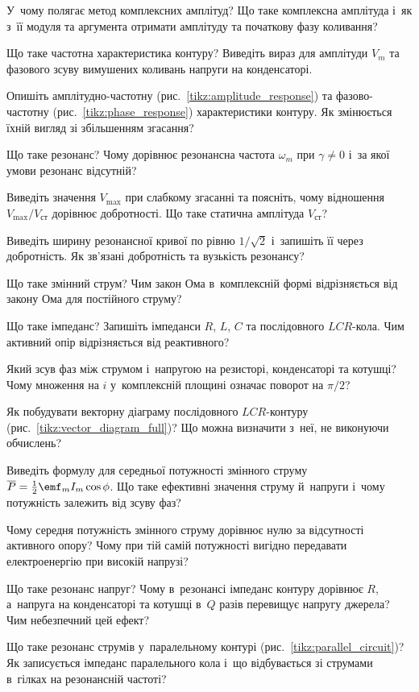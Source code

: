 \begin{Questions}
\begin{quizlist}
	\item У~чому полягає метод комплексних амплітуд? Що таке комплексна амплітуда і~як з~її модуля та аргумента отримати амплітуду та початкову фазу коливання?
	\item Що таке частотна характеристика контуру? Виведіть вираз для амплітуди $V_m$ та фазового зсуву вимушених коливань напруги на конденсаторі.
	\item Опишіть амплітудно-частотну (рис.~\ref{tikz:amplitude_response}) та фазово-частотну (рис.~\ref{tikz:phase_response}) характеристики контуру. Як змінюється їхній вигляд зі збільшенням згасання?
	\item Що таке резонанс? Чому дорівнює резонансна частота $\omega_m$ при $\gamma\ne0$ і~за якої умови резонанс відсутній?
	\item Виведіть значення $V_{\max}$ при слабкому згасанні та поясніть, чому відношення $V_{\max}/V_{\text{ст}}$ дорівнює добротності. Що таке статична амплітуда $V_{\text{ст}}$?
	\item Виведіть ширину резонансної кривої по рівню $1/\sqrt2$ і~запишіть її через добротність. Як зв'язані добротність та вузькість резонансу?
	\item Що таке змінний струм? Чим закон Ома в~комплексній формі відрізняється від закону Ома для постійного струму?
	\item Що таке імпеданс? Запишіть імпеданси $R$, $L$, $C$ та послідовного $LCR$-кола. Чим активний опір відрізняється від реактивного?
	\item Який зсув фаз між струмом і~напругою на резисторі, конденсаторі та котушці? Чому множення на $i$ у~комплексній площині означає поворот на $\pi/2$?
	\item Як побудувати векторну діаграму послідовного $LCR$-контуру (рис.~\ref{tikz:vector_diagram_full})? Що можна визначити з~неї, не виконуючи обчислень?
	\item Виведіть формулу для середньої потужності змінного струму $\overline P = \frac12\emf_mI_m\cos\phi$. Що таке ефективні значення струму й~напруги і~чому потужність залежить від зсуву фаз?
	\item Чому середня потужність змінного струму дорівнює нулю за відсутності активного опору? Чому при тій самій потужності вигідно передавати електроенергію при високій напрузі?
	\item Що таке резонанс напруг? Чому в~резонансі імпеданс контуру дорівнює $R$, а~напруга на конденсаторі та котушці в~$Q$ разів перевищує напругу джерела? Чим небезпечний цей ефект?
	\item Що таке резонанс струмів у~паралельному контурі (рис.~\ref{tikz:parallel_circuit})? Як записується імпеданс паралельного кола і~що відбувається зі струмами в~гілках на резонансній частоті?

\end{quizlist}
\end{Questions}
